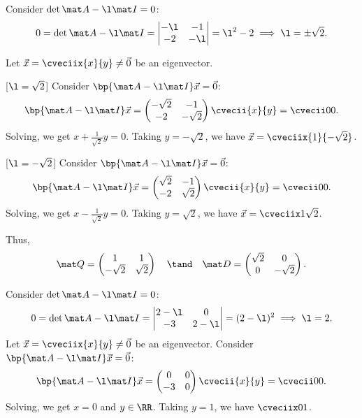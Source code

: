 \begin{solution}
    \begin{ppart}
        Consider $\det{\mat A - \l \mat I} = 0$: \[0 = \det{\mat A - \l \mat I} = \begin{vmatrix}-\l & -1 \\ -2 & -\l\end{vmatrix} = \l^2 - 2 \implies \l = \pm \sqrt2.\]

        Let $\vec x = \cveciix{x}{y} \neq \vec 0$ be an eigenvector.

        [$\l = \sqrt2$] Consider $\bp{\mat A - \l \mat I} \vec x = \vec 0$: \[\bp{\mat A - \l \mat I} \vec x = \begin{pmatrix}-\sqrt2 & -1 \\ -2 & -\sqrt2\end{pmatrix} \cvecii{x}{y} = \cvecii00.\] Solving, we get $x + \frac1{\sqrt2} y = 0$. Taking $y = -\sqrt2$, we have $\vec x = \cveciix{1}{-\sqrt2}$.

        [$\l = -\sqrt2$] Consider $\bp{\mat A - \l \mat I} \vec x = \vec 0$: \[\bp{\mat A - \l \mat I} \vec x = \begin{pmatrix}\sqrt2 & -1 \\ -2 & \sqrt2\end{pmatrix} \cvecii{x}{y} = \cvecii00.\] Solving, we get $x - \frac1{\sqrt2} y = 0$. Taking $y = \sqrt2$, we have $\vec x = \cveciix1{\sqrt2}$.

        Thus, \[\mat Q = \begin{pmatrix}1 & 1 \\ -\sqrt2 & \sqrt2 \end{pmatrix} \quad \tand \quad \mat D = \begin{pmatrix}\sqrt2 & 0 \\ 0 & -\sqrt2 \end{pmatrix}.\]
    \end{ppart}
    \begin{ppart}
        Consider $\det{\mat A - \l \mat I} = 0$: \[0 = \det{\mat A - \l \mat I} = \begin{vmatrix}2-\l & 0 \\ -3 & 2-\l\end{vmatrix} = (2-\l)^2 \implies \l = 2.\] Let $\vec x = \cveciix{x}{y} \neq \vec 0$ be an eigenvector. Consider $\bp{\mat A - \l \mat I} \vec x = \vec 0$: \[\bp{\mat A - \l \mat I} \vec x = \begin{pmatrix}0 & 0 \\ -3 & 0 \end{pmatrix} \cvecii{x}{y} = \cvecii00.\] Solving, we get $x = 0$ and $y \in \RR$. Taking $y = 1$, we have $\cveciix01$.


\end{ppart}
\end{solution}
